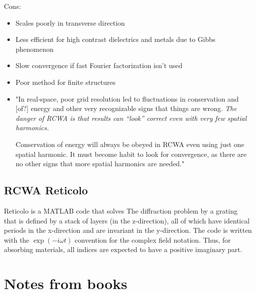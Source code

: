 Cons:
\begin{itemize}
    \item Scales poorly in transverse direction
    
    \item Less efficient for high contrast dielectrics and metals due to Gibbs phenomenon
    
    \item Slow convergence if fast Fourier factorization isn't used
    
    \item Poor method for finite structures
    
    \item "In real‐space, poor grid resolution led to fluctuations in conservation and [of?] energy and other very recognizable signs that things are wrong. \emph{The danger of RCWA is that results can “look” correct even with very few spatial harmonics.}

    Conservation of energy will always be obeyed in RCWA  even using just one spatial harmonic. It must become habit to look for convergence, as there are no other signs that more spatial harmonics are needed."
    
\end{itemize}

\subsection{RCWA Reticolo}
Reticolo is a MATLAB code that solves The diffraction problem by a grating that is defined by a stack of layers (in the z-direction), all of which have identical periods in the x-direction and are invariant in the y-direction. The code is written with the $\exp (-i\omega t)$ convention for the complex field notation. Thus, for absorbing materials, all indices are expected to have a positive imaginary part.


\section{Notes from books}
